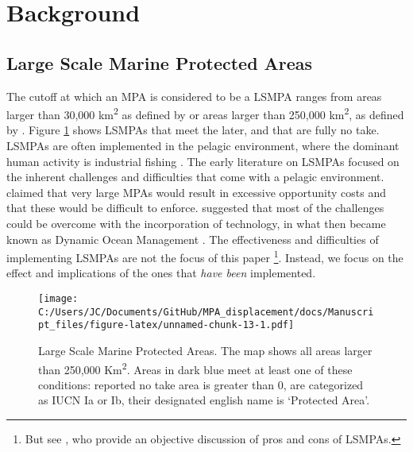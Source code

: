 \documentclass[11pt,]{article}
\let\rmarkdownfootnote\footnote%
\def\footnote{\protect\rmarkdownfootnote}
\begin{document}
\hypertarget{background}{%
\section{Background}\label{background}}

\hypertarget{large-scale-marine-protected-areas}{%
\subsection{Large Scale Marine Protected
Areas}\label{large-scale-marine-protected-areas}}

The cutoff at which an MPA is considered to be a LSMPA ranges from areas
larger than 30,000 km\textsuperscript{2} as defined by
\citet{desanto_2013} or areas larger than 250,000 km\textsuperscript{2},
as defined by \citep{toonen_2013}. Figure \ref{fig:LSMPAs_map} shows
LSMPAs that meet the later, and that are fully no take. LSMPAs are often
implemented in the pelagic environment, where the dominant human
activity is industrial fishing \citep{gray_2017,kroodsma_2018}. The
early literature on LSMPAs focused on the inherent challenges and
difficulties that come with a pelagic environment. \citet{kaplan_2010}
claimed that very large MPAs would result in excessive opportunity costs
and that these would be difficult to enforce. \citet{game_2009}
suggested that most of the challenges could be overcome with the
incorporation of technology, in what then became known as Dynamic Ocean
Management \citep{maxwell_2015}. The effectiveness and difficulties of
implementing LSMPAs are not the focus of this paper
\footnote{But see \citet{singleton_2014}, who provide an objective discussion of pros and cons of LSMPAs.}.
Instead, we focus on the effect and implications of the ones that
\emph{have been} implemented.

\begin{figure}
\centering
\texttt{[image: C:/Users/JC/Documents/GitHub/MPA\_displacement/docs/Manuscript\_files/figure-latex/unnamed-chunk-13-1.pdf]}
\caption{\label{fig:unnamed-chunk-13}\label{fig:LSMPAs_map}Large Scale
Marine Protected Areas. The map shows all areas larger than 250,000
Km\textsuperscript{2}. Areas in dark blue meet at least one of these
conditions: reported no take area is greater than 0, are categorized as
IUCN Ia or Ib, their designated english name is `Protected Area'.}
\end{figure}
\end{document}
